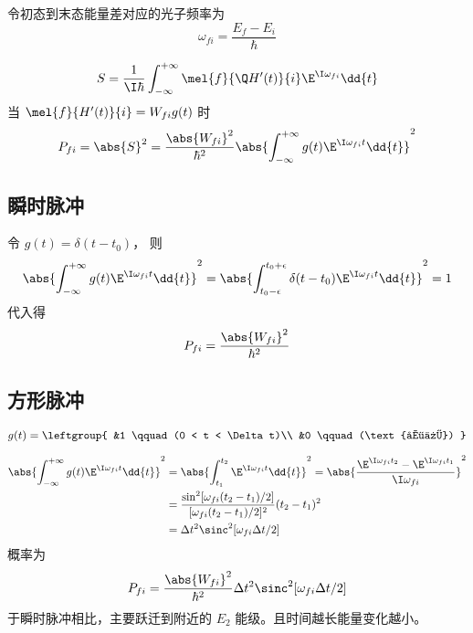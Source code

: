 

令初态到末态能量差对应的光子频率为
\begin{equation}
\omega_{fi} = \frac{E_f - E_i}{\hbar}
\end{equation}

\begin{equation}
S = \frac{1}{\I\hbar} \int_{-\infty}^{+\infty} \mel{f}{\Q H'(t)}{i} \E^{\I\omega_{fi}} \dd{t}
\end{equation}
当 $\mel{f}{H'(t)}{i} = W_{fi} g(t)$ 时
\begin{equation}
P_{fi} = \abs{S}^2 = \frac{\abs{W_{fi}}^2}{\hbar^2} \abs{\int_{-\infty}^{+\infty} g(t) \E^{\I\omega_{fi} t} \dd{t}}^2
\end{equation}

\subsection{瞬时脉冲}
令 $g(t) = \delta(t-t_0)$， 则
\begin{equation}
\abs{\int_{-\infty}^{+\infty} g(t) \E^{\I\omega_{fi} t} \dd{t}}^2
= \abs{\int_{t_0-\epsilon}^{t_0+\epsilon} \delta(t-t_0) \E^{\I\omega_{fi} t} \dd{t}}^2
= 1
\end{equation}
代入得
\begin{equation}
P_{fi} = \frac{\abs{W_{fi}}^2}{\hbar^2}
\end{equation}

\subsection{方形脉冲}
\begin{equation}
g(t) = \leftgroup{
&1 \qquad (0 < t < \Delta t)\\
&0 \qquad (\text{其他})
}\end{equation}

\begin{equation}\begin{aligned}
\abs{\int_{-\infty}^{+\infty} g(t) \E^{\I\omega_{fi}t} \dd{t}}^2
&= \abs{\int_{t_1}^{t_2} \E^{\I\omega_{fi}t} \dd{t}}^2
= \abs{\frac{\E^{\I\omega_{fi}t_2} - \E^{\I\omega_{fi}t_1}}{\I\omega_{fi}}}^2\\
&= \frac{\sin^2[\omega_{fi}(t_2-t_1)/2]}{[\omega_{fi}(t_2-t_1)/2]^2} (t_2-t_1)^2 \\
&= \Delta t^2 \sinc^2[\omega_{fi}\Delta t/2]
\end{aligned}\end{equation}
概率为
\begin{equation}\label{eq_TDPEx_2}
P_{fi} = \frac{\abs{W_{fi}}^2}{\hbar^2} \Delta t^2 \sinc^2[\omega_{fi}\Delta t/2]
\end{equation}
于瞬时脉冲相比，主要跃迁到附近的 $E_2$ 能级。且时间越长能量变化越小。

